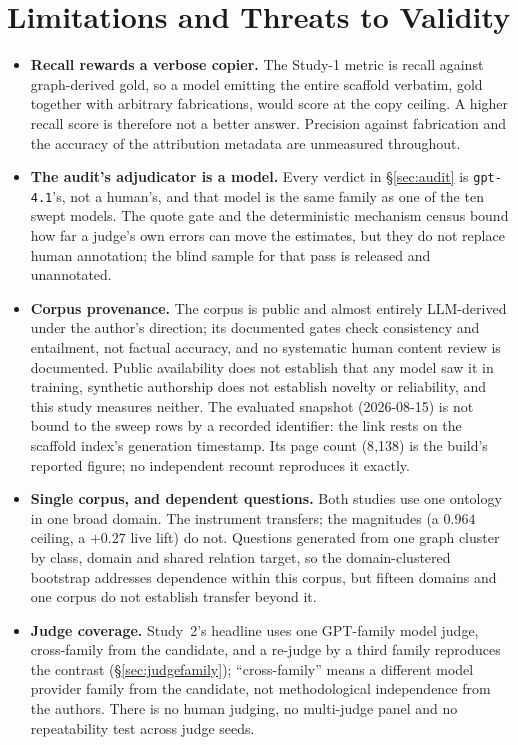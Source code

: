 \documentclass[10pt,twocolumn]{article}
\begin{document}
\section{Limitations and Threats to Validity}\label{sec:limits}
\begin{itemize}[topsep=2pt,itemsep=2pt,leftmargin=1.4em]
\item \textbf{Recall rewards a verbose copier.} The Study-1 metric is recall against graph-derived gold, so a model emitting the entire scaffold verbatim, gold together with arbitrary fabrications, would score at the copy ceiling. A higher recall score is therefore not a better answer. Precision against fabrication and the accuracy of the attribution metadata are unmeasured throughout.
\item \textbf{The audit's adjudicator is a model.} Every verdict in \S\ref{sec:audit} is \texttt{gpt-4.1}'s, not a human's, and that model is the same family as one of the ten swept models. The quote gate and the deterministic mechanism census bound how far a judge's own errors can move the estimates, but they do not replace human annotation; the blind sample for that pass is released and unannotated.
\item \textbf{Corpus provenance.} The corpus is public and almost entirely LLM-derived under the author's direction; its documented gates check consistency and entailment, not factual accuracy, and no systematic human content review is documented. Public availability does not establish that any model saw it in training, synthetic authorship does not establish novelty or reliability, and this study measures neither. The evaluated snapshot (2026-08-15) is not bound to the sweep rows by a recorded identifier: the link rests on the scaffold index's generation timestamp. Its page count (8{,}138) is the build's reported figure; no independent recount reproduces it exactly.
\item \textbf{Single corpus, and dependent questions.} Both studies use one ontology in one broad domain. The instrument transfers; the magnitudes (a $0.964$ ceiling, a $+0.27$ live lift) do not. Questions generated from one graph cluster by class, domain and shared relation target, so the domain-clustered bootstrap addresses dependence within this corpus, but fifteen domains and one corpus do not establish transfer beyond it.
\item \textbf{Judge coverage.} Study~2's headline uses one GPT-family model judge, cross-family from the candidate, and a re-judge by a third family reproduces the contrast (\S\ref{sec:judgefamily}); ``cross-family'' means a different model provider family from the candidate, not methodological independence from the authors. There is no human judging, no multi-judge panel and no repeatability test across judge seeds.

\end{itemize}
\end{document}
